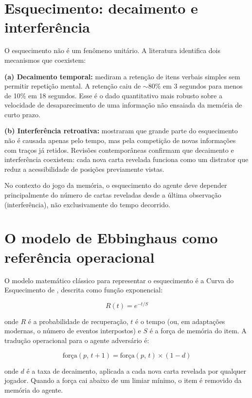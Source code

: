 \documentclass[
    12pt,
    openright,
    twoside,
    a4paper,
    english,
    brazil
]{abntex2}
\begin{document}
\section{Esquecimento: decaimento e interferência}

O esquecimento não é um fenômeno unitário. A literatura identifica dois mecanismos que coexistem:

\textbf{(a) Decaimento temporal:}  mediram a retenção de itens verbais simples sem permitir repetição mental. A retenção caiu de ${\sim}80\%$ em 3 segundos para menos de 10\% em 18 segundos. Esse é o dado quantitativo mais robusto sobre a velocidade de desaparecimento de uma informação não ensaiada da memória de curto prazo.

\textbf{(b) Interferência retroativa:}  mostraram que grande parte do esquecimento não é causada apenas pelo tempo, mas pela competição de novas informações com traços já retidos. Revisões contemporâneas \cite{ricker2016} confirmam que decaimento e interferência coexistem: cada nova carta revelada funciona como um distrator que reduz a acessibilidade de posições previamente vistas.

No contexto do jogo da memória, o esquecimento do agente deve depender principalmente do número de cartas reveladas desde a última observação (interferência), não exclusivamente do tempo decorrido.

\section{O modelo de Ebbinghaus como referência operacional}

O modelo matemático clássico para representar o esquecimento é a Curva do Esquecimento de , descrita como função exponencial:

\begin{equation}
  R(t) = e^{-t/S}
\end{equation}

onde $R$ é a probabilidade de recuperação, $t$ é o tempo (ou, em adaptações modernas, o número de eventos interpostos) e $S$ é a força de memória do item. A tradução operacional para o agente adversário é:

\begin{equation}
  \text{força}(p,\, t+1) = \text{força}(p,\, t) \times (1 - d)
\end{equation}

onde $d$ é a taxa de decaimento, aplicada a cada nova carta revelada por qualquer jogador. Quando a força cai abaixo de um limiar mínimo, o item é removido da memória do agente.
\end{document}
